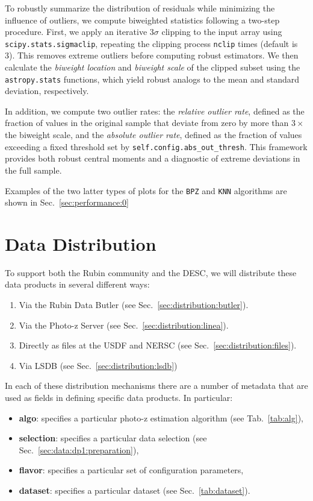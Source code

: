 To robustly summarize the distribution of residuals while minimizing the influence of outliers, we compute biweighted statistics following a two-step procedure. First, we apply an iterative $3\sigma$ clipping to the input array using \texttt{scipy.stats.sigmaclip}, repeating the clipping process \texttt{nclip} times (default is 3). This removes extreme outliers before computing robust estimators. We then calculate the \textit{biweight location} and \textit{biweight scale} of the clipped subset using the \texttt{astropy.stats} functions, which yield robust analogs to the mean and standard deviation, respectively. 

In addition, we compute two outlier rates: the \textit{relative outlier rate}, defined as the fraction of values in the original sample that deviate from zero by more than $3\times$ the biweight scale, and the \textit{absolute outlier rate}, defined as the fraction of values exceeding a fixed threshold set by \texttt{self.config.abs\_out\_thresh}. This framework provides both robust central moments and a diagnostic of extreme deviations in the full sample.

Examples of the two latter types of plots for the \texttt{BPZ} and \texttt{KNN} algorithms are shown in Sec.~\ref{sec:performance:0}


\section{Data Distribution}
\label{sec:distribution:0}

To support both the Rubin community and the DESC, we will distribute these data products in several different ways:
\begin{enumerate}
\item{Via the Rubin Data Butler (see Sec.~\ref{sec:distribution:butler}).}
\item{Via the Photo-z Server (see Sec.~\ref{sec:distribution:linea}).}
\item{Directly as files at the USDF and NERSC (see Sec.~\ref{sec:distribution:files}).}
\item{Via LSDB (see Sec.~\ref{sec:distribution:lsdb})}
\end{enumerate}

In each of these distribution mechanisms there are a number of metadata that are used as fields in defining specific data products.  In particular:

\begin{itemize}
\item{\textbf{algo}: specifies a particular photo-z estimation algorithm (see Tab.~\ref{tab:alg}),}
\item{\textbf{selection}: specifies a particular data selection (see Sec.~\ref{sec:data:dp1:preparation}),}
\item{\textbf{flavor}: specifies a particular set of configuration parameters,}
\item{\textbf{dataset}: specifies a particular dataset (see Sec.~\ref{tab:dataset}).}
\end{itemize}



